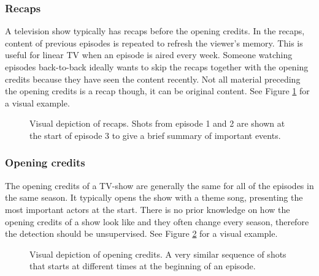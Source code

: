 \documentclass{report}
\begin{document}
\subsubsection{Recaps}
A television show typically has recaps before the opening credits. In the recaps, content of previous episodes is repeated to refresh the viewer's memory. This is useful for linear TV when an episode is aired every week. Someone watching episodes back-to-back ideally wants to skip the recaps together with the opening credits because they have seen the content recently. Not all material preceding the opening credits is a recap though, it can be original content. See Figure \ref{fig:contextrecaps} for a visual example.

\begin{figure}[H]
	\caption{Visual depiction of recaps. Shots from episode 1 and 2 are shown at the start of episode 3 to give a brief summary of important events.}
	\label{fig:contextrecaps}
\end{figure}

\subsubsection{Opening credits}
The opening credits of a TV-show are generally the same for all of the episodes in the same season. It typically opens the show with a theme song, presenting the most important actors at the start. There is no prior knowledge on how the opening credits of a show look like and they often change every season, therefore the detection should be unsupervised. See Figure \ref{fig:contextopeningcredits} for a visual example.

\begin{figure}[H]
	\caption{Visual depiction of opening credits. A very similar sequence of shots that starts at different times at the beginning of an episode.}
	\label{fig:contextopeningcredits}
\end{figure}
\end{document}
